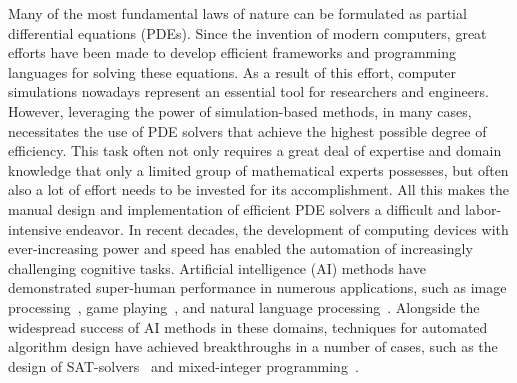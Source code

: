 Many of the most fundamental laws of nature can be formulated as partial differential equations (PDEs).
Since the invention of modern computers, great efforts have been made to develop efficient frameworks and programming languages for solving these equations.
As a result of this effort, computer simulations nowadays represent an essential tool for researchers and engineers.
However, leveraging the power of simulation-based methods, in many cases, necessitates the use of PDE solvers that achieve the highest possible degree of efficiency.
This task often not only requires a great deal of expertise and domain knowledge that only a limited group of mathematical experts possesses, but often also a lot of effort needs to be invested for its accomplishment.
All this makes the manual design and implementation of efficient PDE solvers a difficult and labor-intensive endeavor.
In recent decades, the development of computing devices with ever-increasing power and speed has enabled the automation of increasingly challenging cognitive tasks.
Artificial intelligence (AI) methods have demonstrated super-human performance in numerous applications, such as image processing~\cite{krizhevsky2017imagenet}, game playing~\cite{schrittwieser2020mastering,reed2022generalist}, and natural language processing~\cite{brown2020language}.
Alongside the widespread success of AI methods in these domains, techniques for automated algorithm design have achieved breakthroughs in a number of cases, such as the design of SAT-solvers~\cite{khudabukhsh2016satenstein} and mixed-integer programming~\cite{hutter2010automated}.
